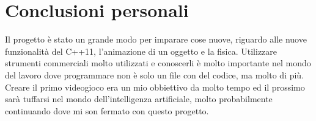 \section{Conclusioni personali}
Il progetto è stato un grande modo per imparare cose nuove, riguardo alle nuove funzionalità del C++11, l'animazione di un oggetto e la fisica. Utilizzare strumenti commerciali molto utilizzati e conoscerli è molto importante nel mondo del lavoro dove programmare non è solo un file con del codice, ma molto di più. Creare il primo videogioco era un mio obbiettivo da molto tempo ed il prossimo sarà tuffarsi nel mondo dell'intelligenza artificiale, molto probabilmente continuando dove mi son fermato con questo progetto.
